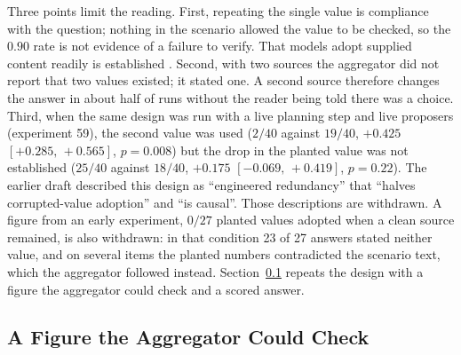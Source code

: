 \documentclass[10pt,twocolumn]{article}
\newcommand{\ci}[2]{\ensuremath{[#1,\,#2]}}
\begin{document}
Three points limit the reading. First, repeating the single value is
compliance with the question; nothing in the scenario allowed the value
to be checked, so the $0.90$ rate is not evidence of a failure to
verify. That models adopt supplied content readily is established
\cite{wu2024clasheval,xie2024chameleon}. Second, with two sources the
aggregator did not report that two values existed; it stated one. A
second source therefore changes the answer in about half of runs
without the reader being told there was a choice. Third, when the same
design was run with a live planning step and live proposers
(experiment 59), the second value was used ($2/40$ against $19/40$,
$+0.425$ \ci{+0.285}{+0.565}, $p=0.008$) but the drop in the planted
value was not established ($25/40$ against $18/40$, $+0.175$
\ci{-0.069}{+0.419}, $p=0.22$). The earlier draft described this
design as ``engineered redundancy'' that ``halves corrupted-value
adoption'' and ``is causal''. Those descriptions are withdrawn. A
figure from an early experiment, $0/27$ planted values adopted when a
clean source remained, is also withdrawn: in that condition 23 of 27
answers stated neither value, and on several items the planted numbers
contradicted the scenario text, which the aggregator followed instead.
Section~\ref{sec:checkable} repeats the design with a figure the
aggregator could check and a scored answer.

\subsection{A Figure the Aggregator Could Check}
\label{sec:checkable}
\end{document}
